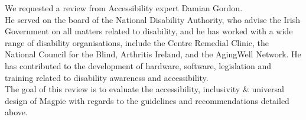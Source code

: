\noindent We requested a review from Accessibility expert Damian Gordon.\\
He served on the board of the National Disability Authority, who advise the Irish Government on all matters related to disability, and he has worked with a wide range of disability organisations, include the Centre Remedial Clinic, the National Council for the Blind, Arthritis Ireland, and the Aging\-Well Network. He has contributed to the development of hardware, software, legislation and training related to disability awareness and accessibility. \\

\noindent The goal of this review is to evaluate the accessibility, inclusivity \& universal design of Magpie with regards to the guidelines and recommendations detailed above.\\

